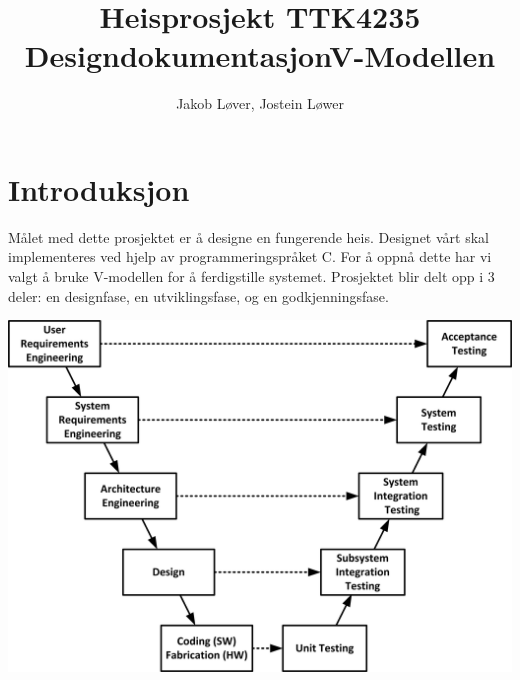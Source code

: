 \documentclass[10pt,a4paper]{article}
\author{Jakob Løver, Jostein Løwer}
\title{Heisprosjekt TTK4235 \protect\\Designdokumentasjon}
\begin{document}
\maketitle
\pagebreak
\tableofcontents
\pagebreak

\section{Introduksjon}
Målet med dette prosjektet er å designe en fungerende heis. Designet vårt skal implementeres ved hjelp av programmeringspråket C. For å oppnå dette har vi valgt å bruke V-modellen for å ferdigstille systemet. Prosjektet blir delt opp i 3 deler: en designfase, en utviklingsfase, og en godkjenningsfase.

\begin{center}
	\includegraphics[scale=0.9]{v-modellen.jpg}
	\title{V-Modellen}
\end{center}



\pagebreak
\end{document}
